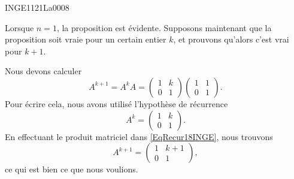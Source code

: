 

\begin{corrige}{INGE1121La0008}

	Lorsque $n=1$, la proposition est évidente. Supposons maintenant que la proposition soit vraie pour un certain entier $k$, et prouvons qu'alors c'est vrai pour $k+1$.

	Nous devons calculer
	\begin{equation}		\label{EqRecur18INGE}
		A^{k+1}=A^kA=\begin{pmatrix}
			1	&	k	\\ 
			0	&	1	
		\end{pmatrix}
		\begin{pmatrix}
			1	&	1	\\ 
			0	&	1	
		\end{pmatrix}.
	\end{equation}
	Pour écrire cela, nous avons utilisé l'hypothèse de récurrence 
	\begin{equation}
		A^k=\begin{pmatrix}
			1	&	k	\\ 
			0	&	1	
		\end{pmatrix}.
	\end{equation}
	En effectuant le produit matriciel dans \eqref{EqRecur18INGE}, nous trouvons
	\begin{equation}
		A^{k+1}=\begin{pmatrix}
			1	&	k+1	\\ 
			0	&	1	
		\end{pmatrix},
	\end{equation}
	ce qui est bien ce que nous voulions.

\end{corrige}

